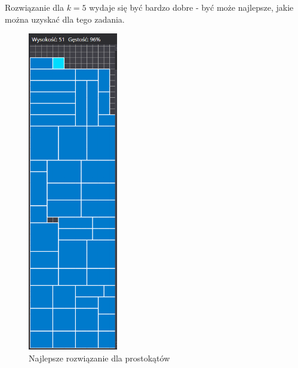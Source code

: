 \documentclass{article}
\begin{document}
\begin{enumerate}
Rozwiązanie dla $k=5$ wydaje się być bardzo dobre - być może najlepsze, jakie można uzyskać dla tego zadania.
\begin{figure}[H]
\centering
\includegraphics[width=0.35\textwidth]{prostokaty.PNG}
\caption{Najlepsze rozwiązanie dla prostokątów}
\end{figure}

\end{enumerate}
\end{document}
